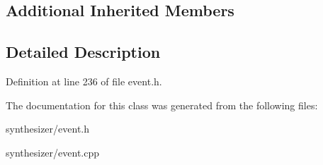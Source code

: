 \subsection*{Additional Inherited Members}


\subsection{Detailed Description}


Definition at line 236 of file event.\+h.



The documentation for this class was generated from the following files\+:\begin{DoxyCompactItemize}
\item 
synthesizer/event.\+h\item 
synthesizer/event.\+cpp\end{DoxyCompactItemize}
